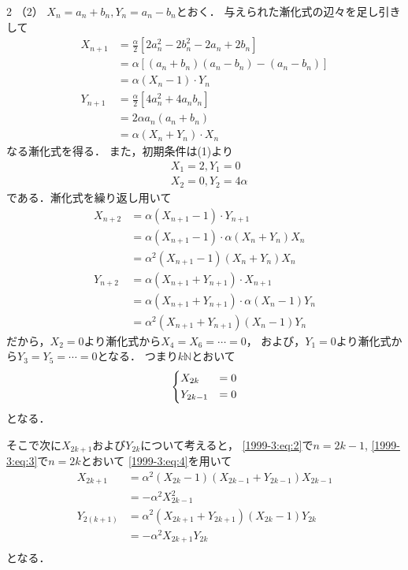 \documentclass[../../../../main.tex]{subfiles}
\begin{document}
\begin{multicols}{2}
    （2）
    $X_n = a_n + b_n, Y_n = a_n - b_n$とおく．
    与えられた漸化式の辺々を足し引きして
    \begin{align*}
        X_{n+1}
         & = \frac{\alpha}{2} \left[2a_n^2-2b_n^2-2a_n+2b_n\right] \\
         & = \alpha \left[(a_n+b_n)(a_n-b_n)-(a_n-b_n)\right]      \\
         & = \alpha (X_n - 1) \cdot Y_n                            \\
        Y_{n+1}
         & = \frac{\alpha}{2} \left[4a_n^2+4a_nb_n\right]          \\
         & = 2\alpha a_n(a_n+b_n)                                  \\
         & = \alpha (X_n+Y_n) \cdot X_n
    \end{align*}
    なる漸化式を得る．
    また，初期条件は(1)より
    \begin{align*}
         & X_1  = 2, Y_1 = 0      \\
         & X_2 = 0, Y_2 = 4\alpha
    \end{align*}
    である．漸化式を繰り返し用いて
    \begin{align}
        X_{n+2}
         & =  \alpha (X_{n+1} - 1) \cdot Y_{n+1}                       \\
         & = \alpha (X_{n+1} - 1) \cdot  \alpha (X_n+Y_n)X_n           \\
         & = \alpha^2 (X_{n+1} - 1)(X_n+Y_n)X_n   \label{1999-3:eq:2}  \\
        Y_{n+2}
         & = \alpha (X_{n+1}+Y_{n+1}) \cdot X_{n+1}                    \\
         & = \alpha (X_{n+1}+Y_{n+1}) \cdot \alpha (X_n - 1)Y_n        \\
         & = \alpha^2 (X_{n+1}+Y_{n+1})(X_n - 1)Y_n\label{1999-3:eq:3}
    \end{align}
    だから，$X_2=0$より漸化式から$X_4=X_6=\cdots = 0$，
    および，$Y_1=0$より漸化式から$Y_3=Y_5=\cdots = 0$となる．
    つまり$k\mathbb{N}$とおいて
    \begin{align}
        \begin{dcases}
            X_{2k}   & = 0 \\
            Y_{2k-1} & = 0
        \end{dcases}\label{1999-3:eq:4}
    \end{align}
    となる．

    そこで次に$X_{2k+1}$および$Y_{2k}$について考えると，
    \cref{1999-3:eq:2}で$n=2k-1$, \cref{1999-3:eq:3}で$n=2k$とおいて
    \cref{1999-3:eq:4}を用いて
    \begin{align}
        X_{2k+1}
         & = \alpha^2 (X_{2k} - 1)(X_{2k-1}+Y_{2k-1})X_{2k-1} \\
         & = -\alpha^2 X^2_{2k-1} \label{1999-3:eq:5}         \\
        Y_{2(k+1)}
         & =\alpha^2 (X_{2k+1}+Y_{2k+1})(X_{2k} - 1)Y_{2k}    \\
         & = - \alpha^2 X_{2k+1}Y_{2k} \label{1999-3:eq:6}    \\
    \end{align}
    となる．


\end{multicols}
\end{document}
